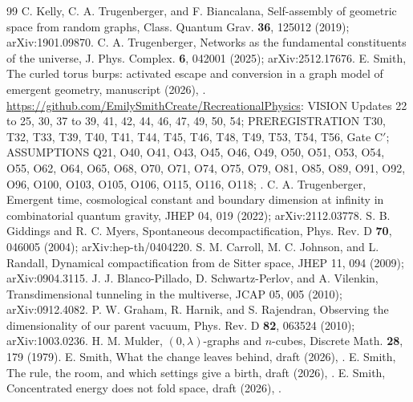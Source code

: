 \documentclass[aps,pre,10pt,twocolumn,superscriptaddress,nofootinbib]{revtex4-2}
\begin{document}
\begin{thebibliography}{99}
 C. Kelly, C. A. Trugenberger, and F. Biancalana, Self-assembly of geometric space from random
graphs, Class. Quantum Grav. \textbf{36}, 125012 (2019); arXiv:1901.09870.
 C. A. Trugenberger, Networks as the fundamental constituents of the universe, J. Phys. Complex.
\textbf{6}, 042001 (2025); arXiv:2512.17676.
 E. Smith, The curled torus burps: activated escape and conversion in a graph model of emergent
geometry, manuscript (2026), .
 \url{https://github.com/EmilySmithCreate/RecreationalPhysics}: VISION Updates 22 to 25, 30, 37 to 39,
41, 42, 44, 46, 47, 49, 50, 54; PREREGISTRATION T30, T32, T33, T39, T40, T41, T44, T45, T46, T48, T49, T53, T54, T56,
Gate C$'$; ASSUMPTIONS Q21, O40, O41, O43, O45, O46, O49, O50, O51, O53, O54, O55, O62, O64, O65, O68, O70, O71,
O74, O75, O79, O81, O85, O89, O91, O92, O96, O100, O103, O105, O106, O115, O116, O118;
.
 C. A. Trugenberger, Emergent time, cosmological constant and boundary dimension at infinity in
combinatorial quantum gravity, JHEP 04, 019 (2022); arXiv:2112.03778.
 S. B. Giddings and R. C. Myers, Spontaneous decompactification, Phys. Rev. D \textbf{70}, 046005
(2004); arXiv:hep-th/0404220.
 S. M. Carroll, M. C. Johnson, and L. Randall, Dynamical compactification from de Sitter space, JHEP
11, 094 (2009); arXiv:0904.3115.
 J. J. Blanco-Pillado, D. Schwartz-Perlov, and A. Vilenkin, Transdimensional tunneling in the
multiverse, JCAP 05, 005 (2010); arXiv:0912.4082.
 P. W. Graham, R. Harnik, and S. Rajendran, Observing the dimensionality of our parent vacuum, Phys.
Rev. D \textbf{82}, 063524 (2010); arXiv:1003.0236.
 H. M. Mulder, $(0,\lambda)$-graphs and $n$-cubes, Discrete Math. \textbf{28}, 179 (1979).
 E. Smith, What the change leaves behind, draft (2026), .
 E. Smith, The rule, the room, and which settings give a birth, draft (2026),
.
 E. Smith, Concentrated energy does not fold space, draft (2026),
.
\end{thebibliography}
\end{document}
